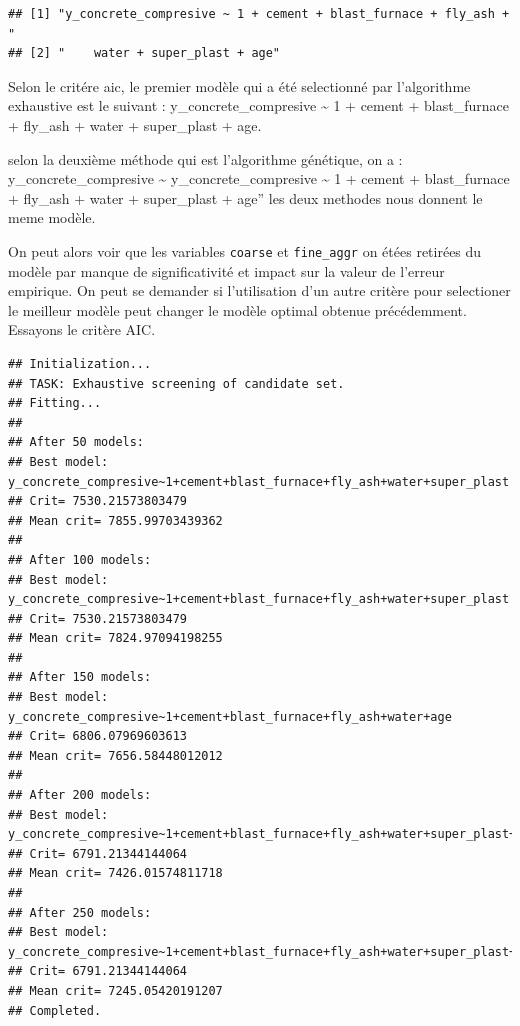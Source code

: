 \documentclass[
  12pt,
]{article}
\begin{document}
\begin{verbatim}
## [1] "y_concrete_compresive ~ 1 + cement + blast_furnace + fly_ash + "
## [2] "    water + super_plast + age"
\end{verbatim}

Selon le critére aic, le premier modèle qui a été selectionné par
l'algorithme exhaustive est le suivant : y\_concrete\_compresive
\textasciitilde{} 1 + cement + blast\_furnace + fly\_ash + water +
super\_plast + age.

selon la deuxième méthode qui est l'algorithme génétique, on a :
y\_concrete\_compresive \textasciitilde{} y\_concrete\_compresive
\textasciitilde{} 1 + cement + blast\_furnace + fly\_ash + water +
super\_plast + age'' les deux methodes nous donnent le meme modèle.

On peut alors voir que les variables \texttt{coarse} et
\texttt{fine\_aggr} on étées retirées du modèle par manque de
significativité et impact sur la valeur de l'erreur empirique. On peut
se demander si l'utilisation d'un autre critère pour selectioner le
meilleur modèle peut changer le modèle optimal obtenue précédemment.
Essayons le critère AIC.

\begin{verbatim}
## Initialization...
## TASK: Exhaustive screening of candidate set.
## Fitting...
## 
## After 50 models:
## Best model: y_concrete_compresive~1+cement+blast_furnace+fly_ash+water+super_plast
## Crit= 7530.21573803479
## Mean crit= 7855.99703439362
## 
## After 100 models:
## Best model: y_concrete_compresive~1+cement+blast_furnace+fly_ash+water+super_plast
## Crit= 7530.21573803479
## Mean crit= 7824.97094198255
## 
## After 150 models:
## Best model: y_concrete_compresive~1+cement+blast_furnace+fly_ash+water+age
## Crit= 6806.07969603613
## Mean crit= 7656.58448012012
## 
## After 200 models:
## Best model: y_concrete_compresive~1+cement+blast_furnace+fly_ash+water+super_plast+age
## Crit= 6791.21344144064
## Mean crit= 7426.01574811718
## 
## After 250 models:
## Best model: y_concrete_compresive~1+cement+blast_furnace+fly_ash+water+super_plast+age
## Crit= 6791.21344144064
## Mean crit= 7245.05420191207
## Completed.
\end{verbatim}
\end{document}
